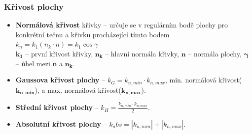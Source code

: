 \subsubsection{Křivost plochy}
\begin{itemize}
	\item \textbf{Normálová křivost} křivky -- určuje se v regulárním bodě plochy pro konkrétní tečnu a křivku procházející tímto bodem $k_n = k_1(n_k \cdot n) = k_1 \cos{\gamma}$ \\ $\mathbf{k_1}$ -- první křivost křivky, $\mathbf{n_k}$ -- hlavní normála křivky, $\mathbf{n}$ -- normála plochy, $\mathbf{\gamma}$ -- úhel mezi $\mathbf{n}$ a $\mathbf{n_k}$.
	\item \textbf{Gaussova křivost plochy} -- $k_G = k_{n,min} \cdot k_{n,max}$, min. normálová křivost($\mathbf{k_{n,min}}$), a max. normálová křivost($\mathbf{k_{n,max}}$).
	\item \textbf{Střední křivost plochy} -- $k_H = \frac{k_{n,min} \cdot k_{n,max}}{2}$.
	\item \textbf{Absolutní křivost plochy} -- $k_abs = |k_{n,min}| + |k_{n,max}|$.
\end{itemize}
